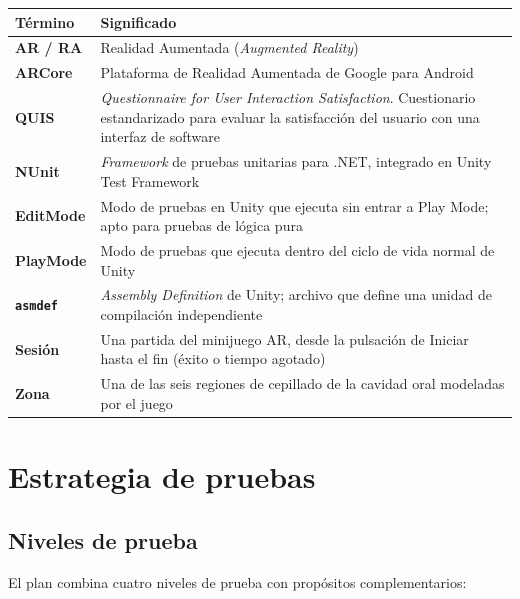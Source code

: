 \documentclass[12pt, a4paper]{article}
\begin{document}
\begin{table}[H]
  \centering
  \renewcommand{\arraystretch}{1.25}
  \begin{tabular}{>{\bfseries}p{2.7cm} p{10cm}}
    \toprule
    Término & Significado \\
    \midrule
    AR / RA       & Realidad Aumentada (\textit{Augmented Reality}) \\
    ARCore        & Plataforma de Realidad Aumentada de Google para Android \\
    QUIS          & \textit{Questionnaire for User Interaction Satisfaction}.
                    Cuestionario estandarizado para evaluar la satisfacción del
                    usuario con una interfaz de software \\
    NUnit         & \textit{Framework} de pruebas unitarias para .NET, integrado
                    en Unity Test Framework \\
    EditMode      & Modo de pruebas en Unity que ejecuta sin entrar a Play Mode;
                    apto para pruebas de lógica pura \\
    PlayMode      & Modo de pruebas que ejecuta dentro del ciclo de vida normal
                    de Unity \\
    \texttt{asmdef} & \textit{Assembly Definition} de Unity; archivo que define
                    una unidad de compilación independiente \\
    Sesión        & Una partida del minijuego AR, desde la pulsación de Iniciar
                    hasta el fin (éxito o tiempo agotado) \\
    Zona          & Una de las seis regiones de cepillado de la cavidad oral
                    modeladas por el juego \\
    \bottomrule
  \end{tabular}
\end{table}

\section{Estrategia de pruebas}

\subsection{Niveles de prueba}

El plan combina cuatro niveles de prueba con propósitos complementarios:
\end{document}
